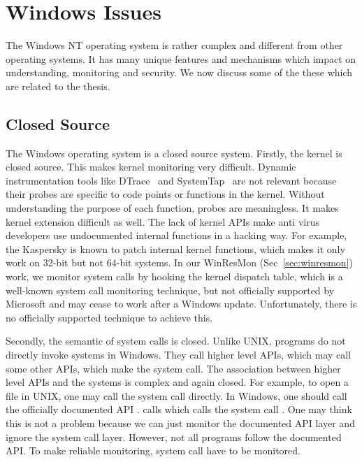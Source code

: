\section{Windows Issues}
\label{sec:bg-win}

The Windows NT operating system is rather complex and different from other
operating systems.
It has many unique features and mechanisms which impact on understanding,
monitoring and security.
We now discuss some of the these which are related to the thesis.

\subsection{Closed Source}

The Windows operating system is a closed source system.
Firstly, the kernel is closed source.
This makes kernel monitoring very difficult.
Dynamic instrumentation tools like DTrace~\cite{cantrill2004dynamic} and
SystemTap~\cite{prasad2005systemtap} are not relevant because their probes are
specific to code points or functions in the kernel.
Without understanding the purpose of each function, probes are meaningless.
It makes kernel extension difficult as well.
The lack of kernel APIs make anti virus developers use undocumented internal
functions in a hacking way.
For example, the Kaspersky is known \cite{skywing2006avwrong} to patch internal
kernel functions, which makes it only work on 32-bit but not 64-bit systems.
In our WinResMon (Sec~\ref{sec:winresmon}) work, we monitor system calls
by hooking the kernel dispatch table, which is a well-known
system call monitoring technique,
but not officially supported by Microsoft and may cease to work
after a Windows update.
Unfortunately, there is no officially supported technique to achieve this.

Secondly, the semantic of system calls is closed.
Unlike UNIX, programs do not directly invoke systems in Windows.
They call higher level APIs, which may call some other APIs, which make
the system call.
The association between higher level APIs and the systems is complex and
again closed.
For example, to open a file in UNIX, one may call the 
system call directly.
In Windows, one should call the officially documented API .
 calls  which calls
the system call .
One may think this is not a problem because we can just monitor the documented
API layer and ignore the system call layer.
However, not all programs follow the documented API.
To make reliable monitoring, system call have to be monitored.

